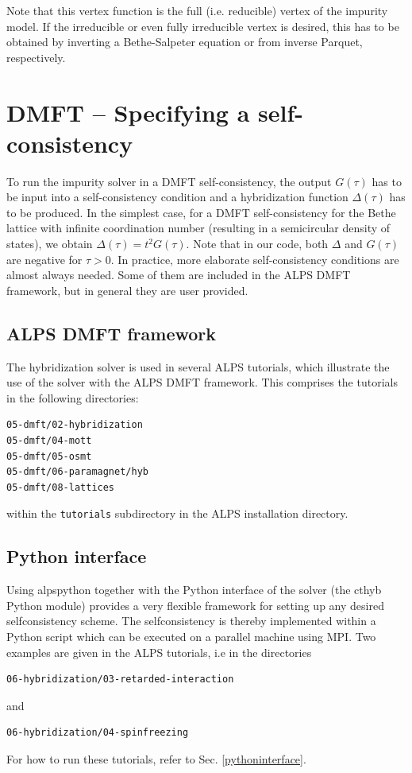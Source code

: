 \documentclass[aps,prb,floatfix,superscriptaddress,twocolumn,notitlepage]{revtex4-1}
\begin{document}
Note that this vertex function is the full (i.e. reducible) vertex of the impurity model. If the irreducible or even fully irreducible vertex is desired, this has to be obtained by inverting a Bethe-Salpeter equation or from inverse Parquet, respectively.

\section{DMFT -- Specifying a self-consistency}
To run the impurity solver in a DMFT self-consistency, the output $G(\tau)$ has to be input into a self-consistency condition and a hybridization function $\Delta(\tau)$ has to be produced.\cite{Georges96,Kotliar06} In the simplest case, for a DMFT self-consistency for the Bethe lattice with infinite coordination number (resulting in a semicircular density of states), we obtain $\Delta(\tau)=t^2G(\tau)$.
Note that in our code, both $\Delta$ and $G(\tau)$ are negative for $\tau>0$.
In practice, more elaborate self-consistency conditions are almost always needed. 
Some of them are included in the ALPS DMFT framework, but in general they are user provided.

\subsection{ALPS DMFT framework}

The hybridization solver is used in several ALPS tutorials, which illustrate the use of the solver with the ALPS DMFT framework. This comprises the tutorials in the following directories:
\begin{verbatim}
05-dmft/02-hybridization
05-dmft/04-mott
05-dmft/05-osmt
05-dmft/06-paramagnet/hyb
05-dmft/08-lattices
\end{verbatim}
within the \verb#tutorials# subdirectory in the ALPS installation directory.

\subsection{Python interface}

Using alpspython together with the Python interface of the solver (the cthyb Python module) provides a very flexible framework for setting up any desired selfconsistency scheme.
The selfconsistency is thereby implemented within a Python script which can be executed on a parallel machine using MPI.
Two examples are given in the ALPS tutorials, i.e in the directories
\begin{verbatim}
06-hybridization/03-retarded-interaction
\end{verbatim}
and
\begin{verbatim}
06-hybridization/04-spinfreezing
\end{verbatim}
For how to run these tutorials, refer to Sec. \ref{pythoninterface}.
\end{document}
